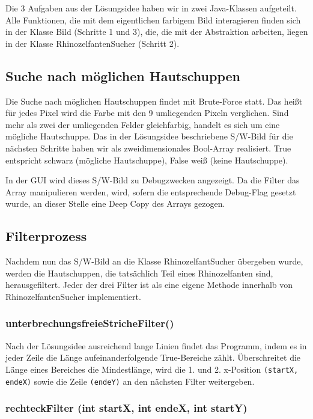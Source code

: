 Die 3 Aufgaben aus der Lösungsidee haben wir in zwei Java-Klassen aufgeteilt. Alle Funktionen, die mit dem eigentlichen farbigem Bild interagieren finden sich in der Klasse Bild (Schritte 1 und 3), die, die mit der Abstraktion arbeiten, liegen in der Klasse RhinozelfantenSucher (Schritt 2).

	\subsection {Suche nach möglichen Hautschuppen}

	Die Suche nach möglichen Hautschuppen findet mit Brute-Force statt. Das heißt für jedes Pixel wird die Farbe mit den 9 umliegenden Pixeln verglichen. Sind mehr als zwei der umliegenden Felder gleichfarbig, handelt es sich um eine mögliche Hautschuppe. Das in der Lösungsidee beschriebene S/W-Bild für die nächsten Schritte haben wir als zweidimensionales Bool-Array realisiert. True entspricht schwarz (mögliche Hautschuppe), False weiß (keine Hautschuppe). 

	In der GUI wird dieses S/W-Bild zu Debugzwecken angezeigt. Da die Filter das Array manipulieren werden, wird, sofern die entsprechende Debug-Flag gesetzt wurde, an dieser Stelle eine Deep Copy des Arrays gezogen.

	\subsection {Filterprozess}
	Nachdem nun das S/W-Bild an die Klasse RhinozelfantSucher übergeben wurde, werden die Hautschuppen, die tatsächlich Teil eines Rhinozelfanten sind, herausgefiltert. Jeder der drei Filter ist als eine eigene Methode innerhalb von RhinozelfantenSucher implementiert.

		\subsubsection{unterbrechungsfreieStricheFilter()}

		Nach der Lösungsidee ausreichend lange Linien findet das Programm, indem es in jeder Zeile die Länge aufeinanderfolgende True-Bereiche zählt. Überschreitet die Länge eines Bereiches die Mindestlänge, wird die 1. und 2. x-Position \texttt{(startX, endeX)} sowie die Zeile \texttt{(endeY)} an den nächsten Filter weitergeben.

		\subsubsection{rechteckFilter (int startX, int endeX, int startY)}

